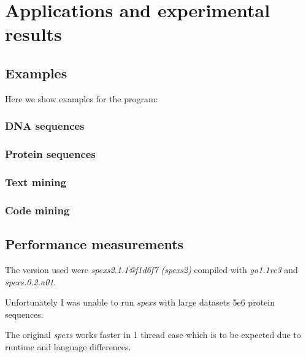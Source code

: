 \chapter{Applications and experimental results}
\label{c:results}

\WIP

\section{Examples}

Here we show examples for the program:

\subsection{DNA sequences}


\subsection{Protein sequences}


\subsection{Text mining}


\subsection{Code mining}


\section{Performance measurements}

The version used were \emph{spexs2.1.1@f1d6f7 (spexs2)} compiled with \emph{go1.1rc3} and \emph{spexs.0.2.a01}.

Unfortunately I was unable to run \emph{spexs} with large datasets 5e6 protein sequences.

The original \emph{spexs} works faster in 1 thread case which is to be expected due to 
runtime and language differences. 